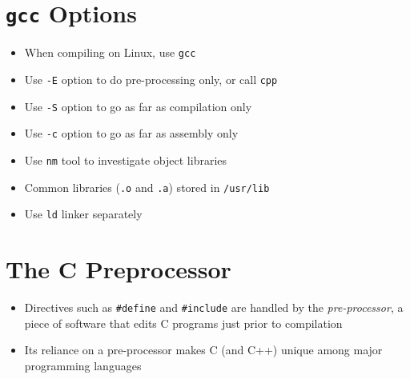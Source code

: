 \documentclass{article}
\begin{document}
\section{\texttt{gcc} Options}
\begin{itemize}
\item When compiling on Linux, use \verb!gcc!
\item Use \verb!-E! option to do pre-processing only, or call \verb!cpp!
\item Use \verb!-S! option to go as far as compilation only
\item Use \verb!-c! option to go as far as assembly only
\item Use \verb!nm! tool to investigate object libraries
\item Common libraries (\verb!.o! and \verb!.a!) stored in \verb!/usr/lib!
\item Use \verb!ld! linker separately
\end{itemize}



\section{The C Preprocessor}
\begin{center}
\end{center}
\begin{itemize}
\item Directives such as \verb!#define! and \verb!#include! are handled by the \emph{pre-processor}, a piece of software that edits C programs just prior to compilation

\item Its reliance on a pre-processor makes C (and C++) unique among major programming languages
\end{itemize}
\end{document}
